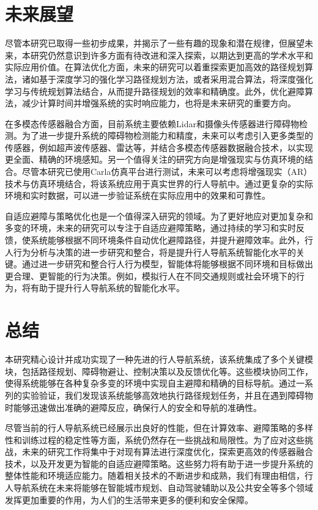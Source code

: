 \section{未来展望}
尽管本研究已取得一些初步成果，并揭示了一些有趣的现象和潜在规律，但展望未来，本研究仍然意识到许多方面有待改进和深入探索，以期达到更高的学术水平和实际应用价值。在算法优化方面，未来的研究可以着重探索更加高效的路径规划算法，诸如基于深度学习的强化学习路径规划方法，或者采用混合算法，将深度强化学习与传统规划算法结合，从而提升路径规划的效率和精确度。此外，优化避障算法，减少计算时间并增强系统的实时响应能力，也将是未来研究的重要方向。

在多模态传感器融合方面，目前系统主要依赖Lidar和摄像头传感器进行障碍物检测。为了进一步提升系统的障碍物检测能力和精度，未来可以考虑引入更多类型的传感器，例如超声波传感器、雷达等，并结合多模态传感器数据融合技术，以实现更全面、精确的环境感知。另一个值得关注的研究方向是增强现实与仿真环境的结合。尽管本研究已使用Carla仿真平台进行测试，未来可以考虑将增强现实（AR）技术与仿真环境结合，将该系统应用于真实世界的行人导航中。通过更复杂的实际环境和实时数据，可以进一步验证系统在实际应用中的效果和可靠性。

自适应避障与策略优化也是一个值得深入研究的领域。为了更好地应对更加复杂和多变的环境，未来的研究可以专注于自适应避障策略，通过持续的学习和实时反馈，使系统能够根据不同环境条件自动优化避障路径，并提升避障效率。此外，行人行为分析与决策的进一步研究和整合，将是提升行人导航系统智能化水平的关键。通过进一步研究和整合行人行为模型，智能体将能够根据不同环境和目标做出更合理、更智能的行为决策。例如，模拟行人在不同交通规则或社会环境下的行为，将有助于提升行人导航系统的智能化水平。

\section{总结}
本研究精心设计并成功实现了一种先进的行人导航系统，该系统集成了多个关键模块，包括路径规划、障碍物避让、控制决策以及反馈优化等。这些模块协同工作，使得系统能够在各种复杂多变的环境中实现自主避障和精确的目标导航。通过一系列的实验验证，我们发现该系统能够高效地执行路径规划任务，并且在遇到障碍物时能够迅速做出准确的避障反应，确保行人的安全和导航的准确性。

尽管当前的行人导航系统已经展示出良好的性能，但在计算效率、避障策略的多样性和训练过程的稳定性等方面，系统仍然存在一些挑战和局限性。为了应对这些挑战，未来的研究工作将集中于对现有算法进行深度优化，探索更高效的传感器融合技术，以及开发更为智能的自适应避障策略。这些努力将有助于进一步提升系统的整体性能和环境适应能力。随着相关技术的不断进步和成熟，我们有理由相信，行人导航系统在未来将能够在智能城市规划、自动驾驶辅助以及公共安全等多个领域发挥更加重要的作用，为人们的生活带来更多的便利和安全保障。


